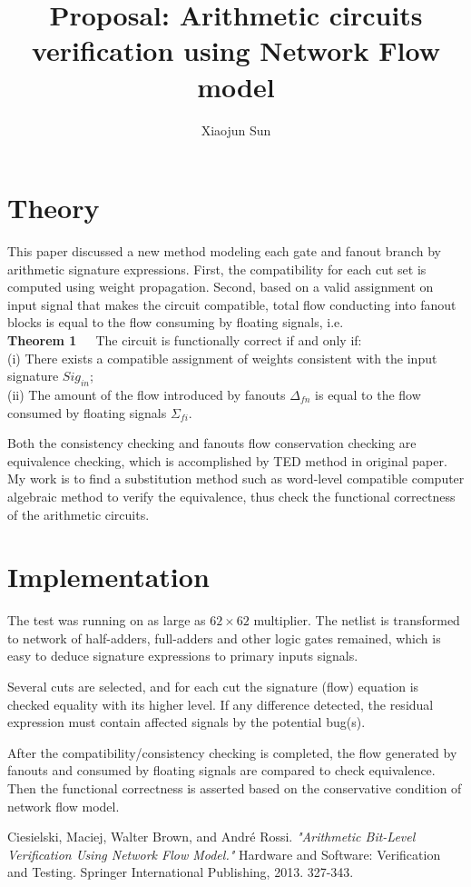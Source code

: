 \documentclass[12pt,letterpaper]{article}
\begin{document}
\title{Proposal: Arithmetic circuits verification using Network Flow model}
\author{Xiaojun Sun}
\maketitle

\section{Theory}
This paper discussed a new method modeling each gate and fanout branch by arithmetic signature expressions.
First, the compatibility for each cut set is computed using weight propagation. Second, based on a valid 
assignment on input signal that makes the circuit compatible, total flow conducting into fanout blocks is
equal to the flow consuming by floating signals, i.e.\\
\textbf{Theorem 1}\ \ \ The circuit is functionally correct if and only if:
\\
(i) There exists a compatible assignment of weights consistent with the input signature $Sig_{in}$;
\\(ii) The amount of the flow introduced by fanouts $\Delta_{fn}$ is equal to the flow consumed by floating signals $\Sigma_{fi}$.

Both the consistency checking and fanouts flow conservation checking are equivalence checking, which is 
accomplished by TED method in original paper. My work is to find a substitution method such as word-level
compatible computer algebraic method to verify the equivalence, thus check the functional correctness of
the arithmetic circuits.

\section{Implementation}
The test was running on as large as $62\times 62$ multiplier. The netlist is transformed to network of
half-adders, full-adders and other logic gates remained, which is easy to deduce signature expressions
to primary inputs signals.

Several cuts are selected, and for each cut the signature (flow) equation is checked equality with its higher 
level. If any difference detected, the residual expression must contain affected signals by the potential bug(s).

After the compatibility/consistency checking is completed, the flow generated by fanouts and consumed by floating
signals are compared to check equivalence. Then the functional correctness is asserted based on the conservative
condition of network flow model.


\begin{thebibliography}{1}
Ciesielski, Maciej, Walter Brown, and André Rossi. \emph{"Arithmetic Bit-Level Verification Using Network Flow Model."} Hardware and Software: Verification and Testing. Springer International Publishing, 2013. 327-343.
\end{thebibliography}
\end{document}
